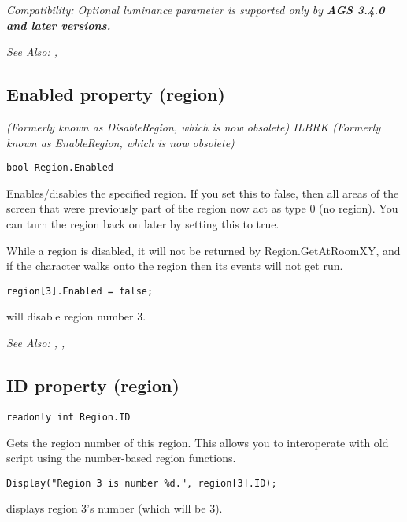 \it{Compatibility:} Optional \it{luminance} parameter is supported only by \bf{AGS 3.4.0} and later versions.

\it{See Also:} ,



\subsection{Enabled property (region)}\label{Region.Enabled}%

\it{(Formerly known as DisableRegion, which is now obsolete)} ILBRK
\it{(Formerly known as EnableRegion, which is now obsolete)}

\begin{verbatim}
bool Region.Enabled
\end{verbatim}
Enables/disables the specified region. If you set this to false, then all areas of the screen
that were previously part of the region now act as type 0 (no region). You can turn the region
back on later by setting this to true.

While a region is disabled, it will not be returned by Region.GetAtRoomXY, and if
the character walks onto the region then its events will not get run.

\begin{verbatim}
region[3].Enabled = false;
\end{verbatim}
will disable region number 3.

\it{See Also:} ,
,


\subsection{ID property (region)}\label{Region.ID}%

\begin{verbatim}
readonly int Region.ID
\end{verbatim}
Gets the region number of this region. This allows you to interoperate with old
script using the number-based region functions.

\begin{verbatim}
Display("Region 3 is number %d.", region[3].ID);
\end{verbatim}
displays region 3's number (which will be 3).

